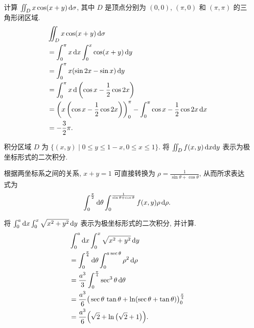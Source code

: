 \documentclass[a4paper,10pt,fleqn]{article}
\begin{document}
\begin{exmp}
    计算 $\iint_Dx\cos(x+y)\,{\rm d}\sigma$, 其中 $D$ 是顶点分别为 $(0,0)$, $(\pi,0)$ 和 $(\pi,\pi)$ 的三角形闭区域.
    \begin{align*}
         & \iint_Dx\cos(x+y)\,{\rm d}\sigma                                                                        \\
         & =\int_0^\pi x\,{\rm d}x\int_0^x\cos(x+y)\,{\rm d}y                                                      \\
         & =\int_0^\pi x(\sin 2x-\sin x)\,{\rm d}y                                                                 \\
         & = \int_0^\pi x\,{\rm d}\left(\cos x-\frac{1}{2}\cos2x\right)                                            \\
         & =\left(x\left(\cos x-\frac{1}{2}\cos2x\right)\right)_0^\pi-\int_0^\pi\cos x-\frac{1}{2}\cos2x\,{\rm d}x \\
         & =-\frac{3}{2}\pi.
    \end{align*}
\end{exmp}

\begin{exmp}
    积分区域 $D$ 为 $\big\{(x,y)\mid0\leq y\leq1-x,0\leq x\leq1\big\}$. 将 $\iint_Df(x,y)\,{\rm d}x{\rm d}y$
    表示为极坐标形式的二次积分.

    根据两坐标系之间的关系, $x+y=1$ 可直接转换为 $\rho=\frac{1}{\sin\theta+\cos\theta}$, 从而所求表达式为
    \[
        \int_0^{\frac{\pi}{2}}{\rm d}\theta\int_0^{\frac{1}{\sin\theta+\cos\theta}}f(x,y)\rho\,{\rm d}\rho.
    \]
\end{exmp}

\pagebreak

\begin{exmp}
    将 $\int_0^a{\rm d}x\int_0^x\sqrt{x^2+y^2}\,{\rm d}y$ 表示为极坐标形式的二次积分, 并计算.
    \begin{align*}
         & \int_0^a{\rm d}x\int_0^x\sqrt{x^2+y^2}\,{\rm d}y                                            \\
         & =\int_0^{\frac{\pi}{4}}{\rm d}\theta\int_0^{a\sec\theta}\rho^2\,{\rm d}\rho                 \\
         & =\frac{a^3}{3}\int_0^{\frac{\pi}{4}}\sec^3\theta\,{\rm d}\theta                             \\
         & =\frac{a^3}{6}\big(\sec\theta\,\tan\theta+\ln(\sec\theta+\tan\theta)\big)_0^{\frac{\pi}{4}} \\
         & =\frac{a^3}{6}\Big(\sqrt{2}+\ln\big(\sqrt{2}+1\big)\Big).
    \end{align*}
\end{exmp}
\end{document}
